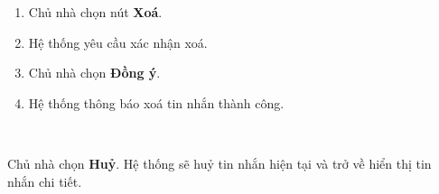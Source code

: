\begin{usecase}
    
    \normalflow
    \begin{enumerate}
		\item Chủ nhà chọn nút \textbf{Xoá}.
        \item Hệ thống yêu cầu xác nhận xoá.
        \item Chủ nhà chọn \textbf{Đồng ý}.
        \item Hệ thống thông báo xoá tin nhắn thành công.
	\end{enumerate} \\ \hline
	
	\noalternative
    
    \exception
    \begin{enumerate}
         Chủ nhà chọn \textbf{Huỷ}. Hệ thống sẽ huỷ tin nhắn hiện tại và trở về hiển thị tin nhắn chi tiết.
    \end{enumerate} \\ \hline
\end{usecase}